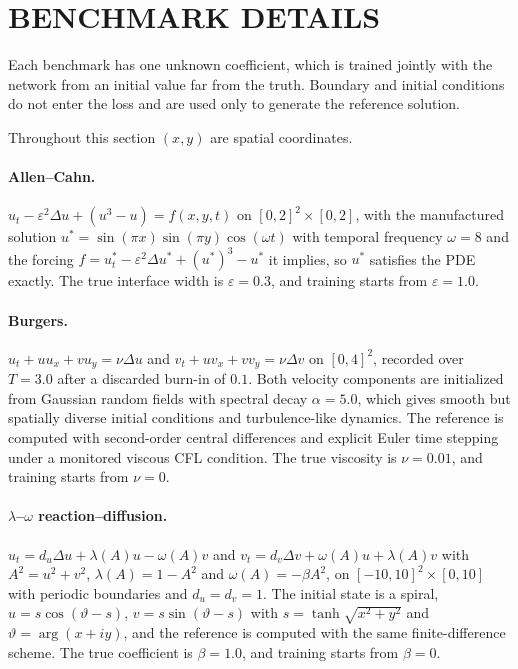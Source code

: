 \documentclass[twoside]{article}
\begin{document}
\section{BENCHMARK DETAILS}
\label{app:benchmarks}

Each benchmark has one unknown coefficient, which is trained jointly with the
network from an initial value far from the truth. Boundary and initial
conditions do not enter the loss and are used only to generate the reference
solution.

Throughout this section $(x, y)$ are spatial coordinates.

\paragraph{Allen--Cahn.}
$u_t - \varepsilon^2 \Delta u + (u^3 - u) = f(x,y,t)$ on $[0,2]^2 \times [0,2]$,
with the manufactured solution $u^* = \sin(\pi x)\sin(\pi y)\cos(\omega t)$ with temporal
frequency $\omega = 8$ and
the forcing $f = u^*_t - \varepsilon^2\Delta u^* + (u^*)^3 - u^*$ it implies, so
$u^*$ satisfies the PDE exactly. The true interface width is
$\varepsilon = 0.3$, and training starts from $\varepsilon = 1.0$.

\paragraph{Burgers.}
$u_t + u u_x + v u_y = \nu \Delta u$ and $v_t + u v_x + v v_y = \nu \Delta v$ on
$[0,4]^2$, recorded over $T = 3.0$ after a discarded burn-in of $0.1$. Both
velocity components are initialized from Gaussian random fields with spectral
decay $\alpha = 5.0$, which gives smooth but spatially diverse initial
conditions and turbulence-like dynamics. The reference is computed with
second-order central differences and explicit Euler time stepping under a monitored
viscous CFL condition. The true viscosity is $\nu = 0.01$, and training starts from
$\nu = 0$.

\paragraph{$\lambda$--$\omega$ reaction--diffusion.}
$u_t = d_u \Delta u + \lambda(A)u - \omega(A)v$ and
$v_t = d_v \Delta v + \omega(A)u + \lambda(A)v$ with $A^2 = u^2 + v^2$,
$\lambda(A) = 1 - A^2$ and $\omega(A) = -\beta A^2$, on
$[-10,10]^2 \times [0,10]$ with periodic boundaries and $d_u = d_v = 1$. The
initial state is a spiral,
$u = s\cos(\vartheta - s)$, $v = s\sin(\vartheta - s)$ with
$s = \tanh\sqrt{x^2+y^2}$ and $\vartheta = \arg(x + iy)$, and the reference is
computed with the same finite-difference scheme. The true coefficient is
$\beta = 1.0$, and training starts from $\beta = 0$.
\end{document}
